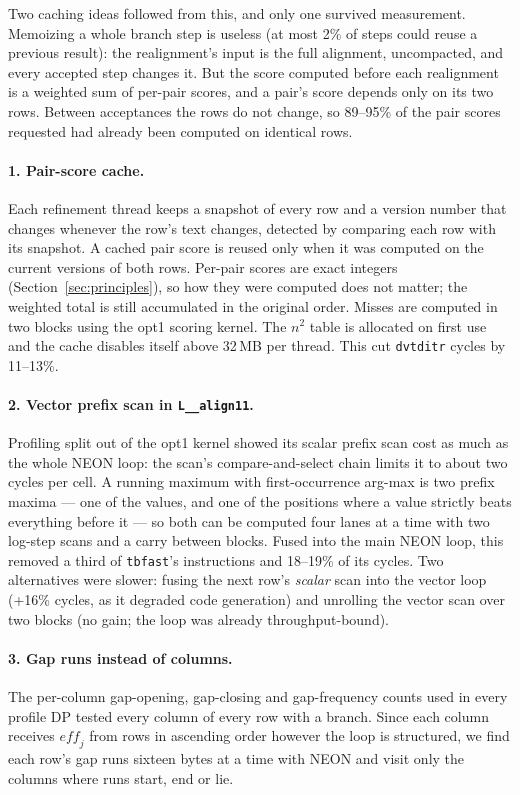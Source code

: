 \documentclass[11pt]{article}
\newcommand{\code}[1]{\texttt{#1}}
\begin{document}
Two caching ideas followed from this, and only one survived measurement. Memoizing a whole
branch step is useless (at most 2\% of steps could reuse a previous result): the
realignment's input is the full alignment, uncompacted, and every accepted step changes it.
But the score computed before each realignment is a weighted sum of per-pair scores, and a
pair's score depends only on its two rows. Between acceptances the rows do not change, so
89--95\% of the pair scores requested had already been computed on identical rows.

\paragraph{1. Pair-score cache.} Each refinement thread keeps a snapshot of every row and a
version number that changes whenever the row's text changes, detected by comparing each
row with its snapshot. A cached pair score is reused only when it was computed on the
current versions of both rows. Per-pair scores are exact integers (Section~\ref{sec:principles}),
so how they were computed does not matter; the weighted total is still accumulated in the
original order. Misses are computed in two blocks using the opt1 scoring kernel. The
$n^2$ table is allocated on first use and the cache disables itself above 32\,MB per thread.
This cut \code{dvtditr} cycles by 11--13\%.

\paragraph{2. Vector prefix scan in \code{L\_\_align11}.} Profiling split out of the opt1
kernel showed its scalar prefix scan cost as much as the whole NEON loop: the scan's
compare-and-select chain limits it to about two cycles per cell. A running maximum with
first-occurrence arg-max is two prefix maxima --- one of the values, and one of the
positions where a value strictly beats everything before it --- so both can be computed
four lanes at a time with two log-step scans and a carry between blocks. Fused into the
main NEON loop, this removed a third of \code{tbfast}'s instructions and 18--19\% of its
cycles. Two alternatives were slower: fusing the next row's \emph{scalar} scan into the
vector loop (+16\% cycles, as it degraded code generation) and unrolling the vector scan
over two blocks (no gain; the loop was already throughput-bound).

\paragraph{3. Gap runs instead of columns.} The per-column gap-opening, gap-closing and
gap-frequency counts used in every profile DP tested every column of every row with a
branch. Since each column receives $\mathit{eff}_j$ from rows in ascending order however
the loop is structured, we find each row's gap runs sixteen bytes at a time with NEON and
visit only the columns where runs start, end or lie.
\end{document}
